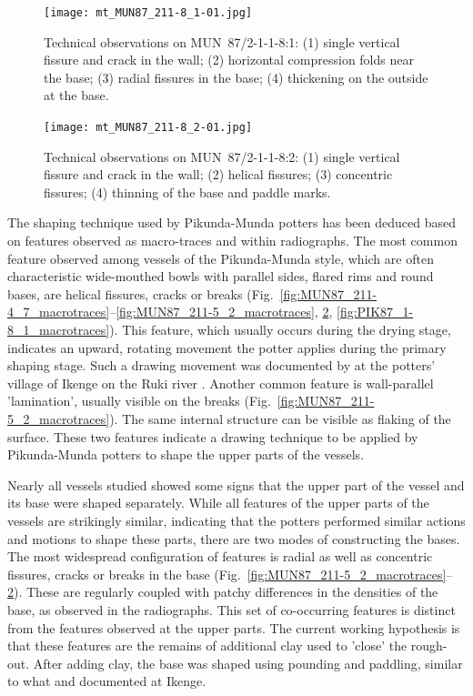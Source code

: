 \documentclass[smallextended,natbib]{svjour3}       %
\begin{document}
\begin{figure}[p]
	\centering
	\texttt{[image: mt\_MUN87\_211-8\_1-01.jpg]}
	\caption{Technical observations on MUN~87/2-1-1-8:1: (1) single vertical fissure and crack in the wall; (2) horizontal compression folds near the base; (3) radial fissures in the base; (4) thickening on the outside at the base.}
	\label{fig:MUN87_211-8_1_macrotraces}
\end{figure}

\begin{figure}[p]
	\centering
	\texttt{[image: mt\_MUN87\_211-8\_2-01.jpg]}
	\caption{Technical observations on MUN~87/2-1-1-8:2: (1) single vertical fissure and crack in the wall; (2) helical fissures; (3) concentric fissures; (4) thinning of the base and paddle marks.}
	\label{fig:MUN87_211-8_2_macrotraces}
\end{figure}

The shaping technique used by Pikunda-Munda potters has been deduced based on features observed as macro-traces and within radiographs. The most common feature observed among vessels of the Pikunda-Munda style, which are often characteristic wide-mouthed bowls with parallel sides, flared rims and round bases, are helical fissures, cracks or breaks (Fig.~\ref{fig:MUN87_211-4_7_macrotraces}--\ref{fig:MUN87_211-5_2_macrotraces}, \ref{fig:MUN87_211-8_2_macrotraces}, \ref{fig:PIK87_1-8_1_macrotraces}). This feature, which usually occurs during the drying stage, indicates an upward, rotating movement the potter applies during the primary shaping stage. Such a drawing movement was documented by \citet{KanimbaMisago.1991} at the potters' village of Ikenge on the Ruki river \citep[Fig.~\ref{fig:map}; ][]{Eggert.1980c}. Another common feature is wall-parallel 'lamination', usually visible on the breaks (Fig.~\ref{fig:MUN87_211-5_2_macrotraces}). The same internal structure can be visible as flaking of the surface. These two features indicate a drawing technique to be applied by Pikunda-Munda potters to shape the upper parts of the vessels.

Nearly all vessels studied showed some signs that the upper part of the vessel and its base were shaped separately. While all features of the upper parts of the vessels are strikingly similar, indicating that the potters performed similar actions and motions to shape these parts, there are two modes of constructing the bases. The most widespread configuration of features is radial as well as concentric fissures, cracks or breaks in the base (Fig.~\ref{fig:MUN87_211-5_2_macrotraces}--\ref{fig:MUN87_211-8_2_macrotraces}). These are regularly coupled with patchy differences in the densities of the base, as observed in the radiographs. This set of co-occurring features is distinct from the features observed at the upper parts. The current working hypothesis is that these features are the remains of additional clay used to 'close' the rough-out. After adding clay, the base was shaped using pounding and paddling, similar to what \citet{Eggert.1980c} and \citet{KanimbaMisago.1991} documented at Ikenge.
\end{document}
